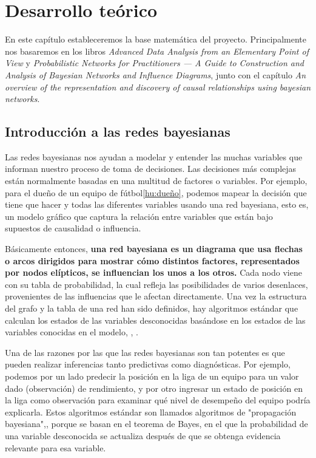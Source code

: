 \chapter{Desarrollo teórico}
En este capítulo estableceremos la base matemática del proyecto. Principalmente nos basaremos en 
los libros \textit{Advanced Data Analysis
from an Elementary Point of View}\cite{ada} y \textit{Probabilistic Networks for Practitioners — A
Guide to Construction and Analysis of Bayesian
Networks and Influence Diagrams}\cite{pgm}, junto con el capítulo \textit{An overview of the representation and 
discovery of causal relationships using bayesian networks}\cite{cooper}.

\section{Introducción a las redes bayesianas}
Las redes bayesianas nos ayudan a modelar y entender las muchas variables que informan nuestro proceso de 
toma de decisiones. Las decisiones más complejas están normalmente basadas en una multitud de factores o 
variables. Por ejemplo, para el dueño de un equipo de fútbol\ref{hu:dueño}, podemos mapear la decisión 
que tiene que hacer y todas las diferentes variables usando 
una red bayesiana, esto es, un modelo gráfico que captura la relación entre variables que están bajo 
supuestos de causalidad o influencia\cite{things-to-know-BN}.

Básicamente entonces, \textbf{una red bayesiana es un diagrama que 
usa flechas o arcos dirigidos para mostrar cómo distintos factores, representados por nodos elípticos, se 
influencian los unos a los otros.} Cada nodo viene con su tabla de probabilidad, la cual refleja las 
posibilidades de varios desenlaces, provenientes de las influencias que le afectan directamente. Una vez 
la estructura del grafo y la tabla de una red han sido definidos, hay algoritmos estándar que 
calculan los estados de las variables desconocidas basándose en los estados de las variables conocidas en el
modelo\cite{learning-algorithms-BN-comparison}, \cite{BN-achilles-heel}, \cite{different-algorithmic-schemes}.

Una de las razones por las que las redes bayesianas son tan potentes es que pueden realizar inferencias 
tanto predictivas como diagnósticas. Por ejemplo, podemos por un lado predecir la posición en la liga de un equipo para 
un valor dado (observación) de rendimiento, y por otro ingresar un estado de posición en la 
liga como observación para examinar qué nivel de desempeño del equipo podría explicarla. Estos algoritmos estándar son
llamados algoritmos de "propagación bayesiana"\cite{Cano2004},\cite{more-algorithms}, \cite{back-prop} porque se basan en el teorema de Bayes, en el que la 
probabilidad de una variable desconocida se actualiza después de que se obtenga evidencia relevante para esa variable\cite{prop-alg}.

